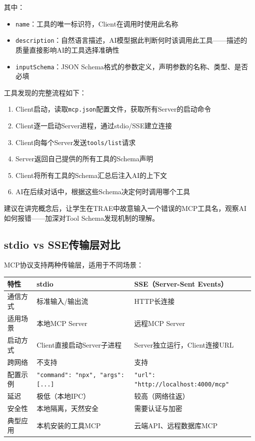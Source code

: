 其中：
\begin{itemize}[leftmargin=2em]
  \item \texttt{name}：工具的唯一标识符，Client在调用时使用此名称
  \item \texttt{description}：自然语言描述，AI模型据此判断何时该调用此工具——描述的质量直接影响AI的工具选择准确性
  \item \texttt{inputSchema}：JSON Schema格式的参数定义，声明参数的名称、类型、是否必填
\end{itemize}

工具发现的完整流程如下：

\begin{enumerate}[leftmargin=2em]
  \item Client启动，读取\texttt{mcp.json}配置文件，获取所有Server的启动命令
  \item Client逐一启动Server进程，通过stdio/SSE建立连接
  \item Client向每个Server发送\texttt{tools/list}请求
  \item Server返回自己提供的所有工具的Schema声明
  \item Client将所有工具的Schema汇总后注入AI的上下文
  \item AI在后续对话中，根据这些Schema决定何时调用哪个工具
\end{enumerate}

\begin{notebox}[教学提示]
建议在讲完概念后，让学生在TRAE中故意输入一个错误的MCP工具名，观察AI如何报错——加深对Tool Schema发现机制的理解。
\end{notebox}

\subsection{stdio vs SSE传输层对比}

MCP协议支持两种传输层，适用于不同场景：

\begin{table}[H]
\centering
\begin{tabular}{lp{5cm}p{5cm}}
\toprule
\textbf{特性} & \textbf{stdio} & \textbf{SSE（Server-Sent Events）} \\
\midrule
通信方式 & 标准输入/输出流 & HTTP长连接 \\
适用场景 & 本地MCP Server & 远程MCP Server \\
启动方式 & Client直接启动Server子进程 & Server独立运行，Client连接URL \\
跨网络 & 不支持 & 支持 \\
配置示例 & \texttt{"command": "npx", "args": [...]} & \texttt{"url": "http://localhost:4000/mcp"} \\
延迟 & 极低（本地IPC） & 较高（网络往返） \\
安全性 & 本地隔离，天然安全 & 需要认证与加密 \\
典型应用 & 本机安装的工具MCP & 云端API、远程数据库MCP \\
\bottomrule
\end{tabular}
\end{table}

